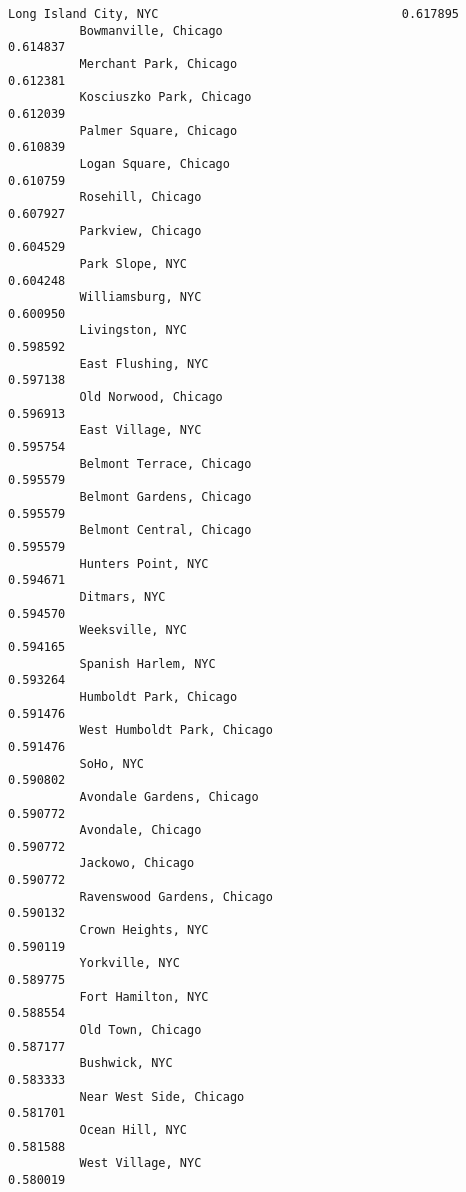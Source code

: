 \documentclass[11pt]{article}
\begin{document}
\begin{Verbatim}[commandchars=\\\{\}]
          Long Island City, NYC                                  0.617895
          Bowmanville, Chicago                                   0.614837
          Merchant Park, Chicago                                 0.612381
          Kosciuszko Park, Chicago                               0.612039
          Palmer Square, Chicago                                 0.610839
          Logan Square, Chicago                                  0.610759
          Rosehill, Chicago                                      0.607927
          Parkview, Chicago                                      0.604529
          Park Slope, NYC                                        0.604248
          Williamsburg, NYC                                      0.600950
          Livingston, NYC                                        0.598592
          East Flushing, NYC                                     0.597138
          Old Norwood, Chicago                                   0.596913
          East Village, NYC                                      0.595754
          Belmont Terrace, Chicago                               0.595579
          Belmont Gardens, Chicago                               0.595579
          Belmont Central, Chicago                               0.595579
          Hunters Point, NYC                                     0.594671
          Ditmars, NYC                                           0.594570
          Weeksville, NYC                                        0.594165
          Spanish Harlem, NYC                                    0.593264
          Humboldt Park, Chicago                                 0.591476
          West Humboldt Park, Chicago                            0.591476
          SoHo, NYC                                              0.590802
          Avondale Gardens, Chicago                              0.590772
          Avondale, Chicago                                      0.590772
          Jackowo, Chicago                                       0.590772
          Ravenswood Gardens, Chicago                            0.590132
          Crown Heights, NYC                                     0.590119
          Yorkville, NYC                                         0.589775
          Fort Hamilton, NYC                                     0.588554
          Old Town, Chicago                                      0.587177
          Bushwick, NYC                                          0.583333
          Near West Side, Chicago                                0.581701
          Ocean Hill, NYC                                        0.581588
          West Village, NYC                                      0.580019

\end{Verbatim}
\end{document}
